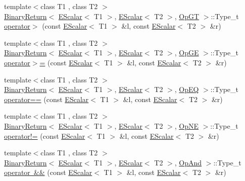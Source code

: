 \begin{DoxyCompactItemize}
\item 
{\footnotesize template$<$class T1 , class T2 $>$ }\\\mbox{\hyperlink{structENSEM_1_1BinaryReturn}{Binary\+Return}}$<$ \mbox{\hyperlink{classENSEM_1_1EScalar}{E\+Scalar}}$<$ T1 $>$, \mbox{\hyperlink{classENSEM_1_1EScalar}{E\+Scalar}}$<$ T2 $>$, \mbox{\hyperlink{structENSEM_1_1OpGT}{Op\+GT}} $>$\+::Type\+\_\+t \mbox{\hyperlink{group__escalar_ga92b83acdab0e4e35ee7687740b1d3a01}{operator$>$}} (const \mbox{\hyperlink{classENSEM_1_1EScalar}{E\+Scalar}}$<$ T1 $>$ \&l, const \mbox{\hyperlink{classENSEM_1_1EScalar}{E\+Scalar}}$<$ T2 $>$ \&r)
\item 
{\footnotesize template$<$class T1 , class T2 $>$ }\\\mbox{\hyperlink{structENSEM_1_1BinaryReturn}{Binary\+Return}}$<$ \mbox{\hyperlink{classENSEM_1_1EScalar}{E\+Scalar}}$<$ T1 $>$, \mbox{\hyperlink{classENSEM_1_1EScalar}{E\+Scalar}}$<$ T2 $>$, \mbox{\hyperlink{structENSEM_1_1OpGE}{Op\+GE}} $>$\+::Type\+\_\+t \mbox{\hyperlink{group__escalar_ga9635179278abcc85536b21baae58904d}{operator$>$=}} (const \mbox{\hyperlink{classENSEM_1_1EScalar}{E\+Scalar}}$<$ T1 $>$ \&l, const \mbox{\hyperlink{classENSEM_1_1EScalar}{E\+Scalar}}$<$ T2 $>$ \&r)
\item 
{\footnotesize template$<$class T1 , class T2 $>$ }\\\mbox{\hyperlink{structENSEM_1_1BinaryReturn}{Binary\+Return}}$<$ \mbox{\hyperlink{classENSEM_1_1EScalar}{E\+Scalar}}$<$ T1 $>$, \mbox{\hyperlink{classENSEM_1_1EScalar}{E\+Scalar}}$<$ T2 $>$, \mbox{\hyperlink{structENSEM_1_1OpEQ}{Op\+EQ}} $>$\+::Type\+\_\+t \mbox{\hyperlink{group__escalar_gaccee099471047aac753f8acd2336898c}{operator==}} (const \mbox{\hyperlink{classENSEM_1_1EScalar}{E\+Scalar}}$<$ T1 $>$ \&l, const \mbox{\hyperlink{classENSEM_1_1EScalar}{E\+Scalar}}$<$ T2 $>$ \&r)
\item 
{\footnotesize template$<$class T1 , class T2 $>$ }\\\mbox{\hyperlink{structENSEM_1_1BinaryReturn}{Binary\+Return}}$<$ \mbox{\hyperlink{classENSEM_1_1EScalar}{E\+Scalar}}$<$ T1 $>$, \mbox{\hyperlink{classENSEM_1_1EScalar}{E\+Scalar}}$<$ T2 $>$, \mbox{\hyperlink{structENSEM_1_1OpNE}{Op\+NE}} $>$\+::Type\+\_\+t \mbox{\hyperlink{group__escalar_ga4d3acce68f40c5503e1e30f756a1ed4c}{operator!=}} (const \mbox{\hyperlink{classENSEM_1_1EScalar}{E\+Scalar}}$<$ T1 $>$ \&l, const \mbox{\hyperlink{classENSEM_1_1EScalar}{E\+Scalar}}$<$ T2 $>$ \&r)
\item 
{\footnotesize template$<$class T1 , class T2 $>$ }\\\mbox{\hyperlink{structENSEM_1_1BinaryReturn}{Binary\+Return}}$<$ \mbox{\hyperlink{classENSEM_1_1EScalar}{E\+Scalar}}$<$ T1 $>$, \mbox{\hyperlink{classENSEM_1_1EScalar}{E\+Scalar}}$<$ T2 $>$, \mbox{\hyperlink{structENSEM_1_1OpAnd}{Op\+And}} $>$\+::Type\+\_\+t \mbox{\hyperlink{group__escalar_ga8ca8cd66f3b104a6439afa608f4a6e50}{operator \&\&}} (const \mbox{\hyperlink{classENSEM_1_1EScalar}{E\+Scalar}}$<$ T1 $>$ \&l, const \mbox{\hyperlink{classENSEM_1_1EScalar}{E\+Scalar}}$<$ T2 $>$ \&r)

\end{DoxyCompactItemize}
